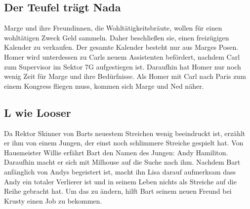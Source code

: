 
\subsection{Der Teufel trägt Nada}\label{LABF17}
Marge und ihre Freundinnen, die Wohltätigkeitsbräute, wollen für einen wohl\-tät\-ig\-en Zweck Geld sammeln. Daher beschließen sie, einen freizügigen Kalender zu verkaufen. Der gesamte Kalender besteht nur aus Marges Posen. Homer wird unterdessen zu Carls neuem Assistenten befördert, nachdem Carl zum Supervisor im Sektor 7G aufgestiegen ist. Daraufhin hat Homer nur noch wenig Zeit für Marge und ihre Bedürfnisse. Als Homer mit Carl nach Paris zum einem Kongress fliegen muss, kommen sich Marge und Ned näher. 


\subsection{L wie Looser}
Da Rektor Skinner von Barts neuestem Streichen wenig beeindruckt ist, erzählt er ihm von einem Jungen, der einst noch schlimmere Streiche gespielt hat. Von Hausmeister Willie erfährt Bart den Namen des Jungen: Andy Hamiliton. Daraufhin macht er sich mit Milhouse auf die Suche nach ihm. Nachdem Bart anfänglich von Andys begeistert ist, macht ihn Lisa darauf aufmerksam dass Andy ein totaler Verlierer ist und in seinem Leben nichts als Streiche auf die Reihe gebracht hat. Um das zu ändern, hilft Bart seinem neuen Freund bei Krusty einen Job zu bekommen. 


